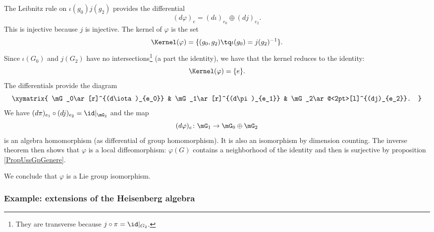 The Leibnitz rule on $\iota(g_0)j(g_2)$ provides the differential
\begin{equation}
    (d\varphi)_e=(d\iota)_{e_0}\oplus(dj)_{e_2}.
\end{equation}
This is injective because $j$ is injective. The kernel of $\varphi$ is the set
\begin{equation}
    \Kernel(\varphi)=\{ (g_0,g_2)\tq \iota(g_0)=j(g_2)^{-1} \}.
\end{equation}
Since $\iota(G_0)$ and $j(G_2)$ have no intersections\footnote{They are transverse because $j\circ \pi=\id|_{G_2}$.} (a part the identity), we have that the kernel reduces to the identity:
\begin{equation}
    \Kernel(\varphi)=\{ e \}.
\end{equation}
The differentials provide the diagram
\begin{equation}
    \xymatrix{
    \mG_0\ar[r]^{(d\iota)_{e_0}}    &   \mG_1\ar[r]^{(d\pi)_{e_1}}  &   \mG_2\ar@<2pt>[l]^{(dj)_{e_2}}.
    }
\end{equation}
We have $(d\pi)_{e_1}\circ (dj)_{e_2}=\id|_{\mG_2}$ and the map
\begin{equation}
    (d\varphi)_e\colon \mG_1\to \mG_0\oplus\mG_2
\end{equation}
is an algebra homomorphism (as differential of group homomorphism). It is also an isomorphism by dimension counting. The inverse theorem then shows that $\varphi$ is a local diffeomorphism: $\varphi(G)$ contains a neighborhood of the identity and then is surjective by proposition \ref{PropUssGpGenere}.

We conclude that $\varphi$ is a Lie group isomorphism.

\subsubsection{Example: extensions of the Heisenberg algebra}

